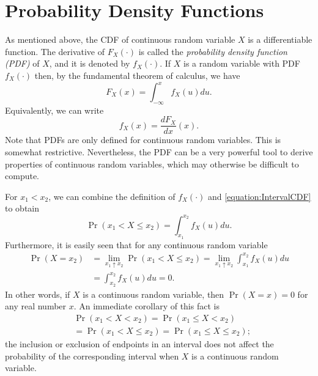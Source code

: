 \section{Probability Density Functions}

As mentioned above, the CDF of continuous random variable $X$ is a differentiable function.
The derivative of $F_X (\cdot)$ is called the \emph{probability density function (PDF)} of $X$, and it is denoted by $f_X(\cdot)$. 
If $X$ is a random variable with PDF $f_X (\cdot)$ then, by the fundamental theorem of calculus, we have
\begin{equation*}
F_X (x) = \int_{- \infty}^x f_X (u) du .
\end{equation*}
Equivalently, we can write
\begin{equation*}
f_X (x) = \frac{d F_X}{dx} (x) .
\end{equation*}
Note that PDFs are only defined for continuous random variables.
This is somewhat restrictive.
Nevertheless, the PDF can be a very powerful tool to derive properties of continuous random variables, which may otherwise be difficult to compute.

For $x_1 < x_2$, we can combine the definition of $f_X(\cdot)$ and \eqref{equation:IntervalCDF} to obtain
\begin{equation*}
\Pr (x_1 < X \leq x_2) = \int_{x_1}^{x_2} f_X (u) du .
\end{equation*}
Furthermore, it is easily seen that for any continuous random variable
\begin{equation*}
\begin{split}
\Pr (X = x_2) &= \lim_{x_1 \uparrow x_2} \Pr (x_1 < X \leq x_2)
= \lim_{x_1 \uparrow x_2} \int_{x_1}^{x_2} f_X (u) du \\
&= \int_{x_2}^{x_2} f_X (u) du = 0.
\end{split}
\end{equation*}
In other words, if $X$ is a continuous random variable, then $\Pr (X = x) = 0$ for any real number $x$.
An immediate corollary of this fact is
\begin{equation*}
\begin{split}
&\Pr (x_1 < X < x_2)
= \Pr (x_1 \leq X < x_2) \\
&= \Pr (x_1 < X \leq x_2)
= \Pr (x_1 \leq X \leq x_2) ;
\end{split}
\end{equation*}
the inclusion or exclusion of endpoints in an interval does not affect the probability of the corresponding interval when $X$ is a continuous random variable.

